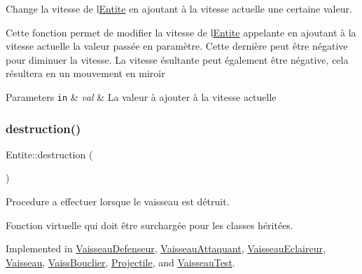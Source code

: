 Change la vitesse de l\textquotesingle{}\mbox{\hyperlink{class_entite}{Entite}} en ajoutant à la vitesse actuelle une certaine valeur. 

Cette fonction permet de modifier la vitesse de l\textquotesingle{}\mbox{\hyperlink{class_entite}{Entite}} appelante en ajoutant à la vitesse actuelle la valeur passée en paramètre. Cette dernière peut être négative pour diminuer la vitesse. La vitesse ésultante peut également être négative, cela résultera en un mouvement en miroir 
\begin{DoxyParams}[1]{Parameters}
\mbox{\tt in}  & {\em val} & La valeur à ajouter à la vitesse actuelle \\
\hline
\end{DoxyParams}
\mbox{\label{class_entite_af5c424f69b2c880ae9c12786abd28592}} 
\subsubsection{\texorpdfstring{destruction()}{destruction()}}
{\footnotesize\ttfamily Entite\+::destruction (\begin{DoxyParamCaption}{ }\end{DoxyParamCaption})\hspace{0.3cm}{\ttfamily [pure virtual]}}



Procedure a effectuer lorsque le vaisseau est détruit. 

Fonction virtuelle qui doit être surchargée pour les classes héritées. 

Implemented in \mbox{\hyperlink{class_vaisseau_defenseur_aeaaaa161533c6aa07b627172d8657b3a}{Vaisseau\+Defenseur}}, \mbox{\hyperlink{class_vaisseau_attaquant_a9afe1d07b85b6064c802205a1d0d777b}{Vaisseau\+Attaquant}}, \mbox{\hyperlink{class_vaisseau_eclaireur_ab4ea82a8fc92dc27c6072481099518bc}{Vaisseau\+Eclaireur}}, \mbox{\hyperlink{class_vaisseau_a6d7506acb12c0367989066c899ec7949}{Vaisseau}}, \mbox{\hyperlink{class_vaiss_bouclier_ab154712cec76a589fd8bce2392982c5b}{Vaiss\+Bouclier}}, \mbox{\hyperlink{class_projectile_a092690ef6f0f9284e05b775f26833c2d}{Projectile}}, and \mbox{\hyperlink{class_vaisseau_test_a5cab0817183471868c5ed6392261f8ec}{Vaisseau\+Test}}.

\mbox{\label{class_entite_a0861182f1af724c8b5fd70b30720fa04}} 
